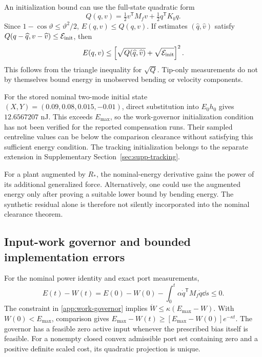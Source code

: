An initialization bound can use the full-state quadratic form
\begin{equation}
 Q(q,v)=\tfrac12v^{\mathsf T}M_fv+
        \tfrac12q^{\mathsf T}K_bq.
 \label{sm:initial-quadratic}
\end{equation}
Since $1-\cos\vartheta\le\vartheta^2/2$, $E(q,v)\le Q(q,v)$.
If estimates $(\widehat q,\widehat v)$ satisfy
$Q(q-\widehat q,v-\widehat v)\le\mathcal E_{\rm init}$, then
\begin{equation}
 E(q,v)\le
 \left[\sqrt{Q(\widehat q,\widehat v)}
                  +\sqrt{\mathcal E_{\rm init}}\right]^2.
 \label{sm:initial-upper-bound}
\end{equation}
This follows from the triangle inequality for $\sqrt Q$.
Tip-only measurements do not by themselves bound energy in unobserved
bending or velocity components.

For the stored nominal two-mode initial state
$(X,Y)=(0.09,0.08,0.015,-0.01)$,
direct substitution into $E_0h_0$ gives $12.6567207$ nJ.
This exceeds $E_{\max}$, so the work-governor initialization condition
has not been verified for the reported compensation runs. Their
sampled centreline values can be below the comparison clearance
without satisfying this sufficient energy condition. The tracking
initialization belongs to the separate extension in
Supplementary Section~\ref{sec:supp-tracking}.

For a plant augmented by $R_*$, the nominal-energy derivative gains
the power of its additional generalized force. Alternatively, one
could use the augmented energy only after proving a suitable lower
bound by bending energy. The synthetic residual alone is therefore
not silently incorporated into the nominal clearance theorem.

\subsection{Input-work governor and bounded implementation errors}
\label{sm:work}
For the nominal power identity and exact port measurements,
\begin{equation}
 E(t)-W(t)=E(0)-W(0)
             -\int_0^t\alpha\dot q^{\mathsf T}M_f\dot q\dd s\le0.
 \label{sm:work-ledger}
\end{equation}
The constraint in \eqref{app:work-governor} implies
$\dot W\le\kappa(E_{\max}-W)$.
With $W(0)<E_{\max}$, comparison gives
$E_{\max}-W(t)\ge[E_{\max}-W(0)]e^{-\kappa t}$.
The governor has a feasible zero active input whenever the prescribed
bias itself is feasible. For a nonempty closed convex admissible port set containing zero and a
positive definite scaled cost, its quadratic projection is unique.

